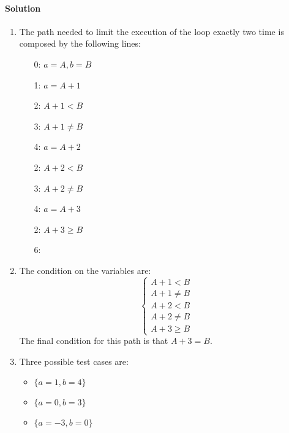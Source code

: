 \paragraph*{Solution}
\begin{enumerate}
    \item The path needed to limit the execution of the loop exactly two time is composed by the following lines: 
        \begin{enumerate}
            \item [0:] $a=A,b=B$
            \item [1:] $a=A+1$
            \item [2:] $A+1<B$
            \item [3:] $A+1 \neq B$
            \item [4:] $a=A+2$
            \item [2:] $A+2<B$
            \item [3:] $A+2 \neq B$
            \item [4:] $a=A+3$
            \item [2:] $A+3 \geq B$
            \item [6:] 
        \end{enumerate}
    \item The condition on the variables are: 
        \[\begin{cases}
            A+1<B \\
            A+1 \neq B \\
            A+2<B \\
            A+2 \neq B \\
            A+3 \geq B
        \end{cases}\]
        The final condition for this path is that $A+3 = B$. 
    \item Three possible test cases are: 
        \begin{itemize}
            \item $\{a = 1, b = 4\}$ 
            \item $\{a = 0, b = 3\}$
            \item $\{a = -3, b = 0\}$
        \end{itemize}
\end{enumerate}